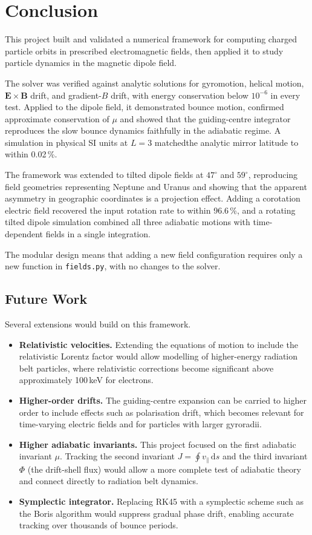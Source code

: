 \chapter{Conclusion}
\label{ch:conclusion}

This project built and validated a numerical framework for computing charged particle orbits in prescribed electromagnetic fields, then applied it to study particle dynamics in the magnetic dipole field.

The solver was verified against analytic solutions for gyromotion, helical motion, $\mathbf{E} \times \mathbf{B}$ drift, and gradient-$B$ drift, with energy conservation below $10^{-6}$ in every test. Applied to the dipole field, it demonstrated bounce motion, confirmed
approximate conservation of $\mu$ and showed that the guiding-centre integrator reproduces the slow bounce dynamics faithfully in the adiabatic regime. A simulation in physical SI units at $L = 3$ matchedthe analytic mirror latitude to within 0.02\,\%.

The framework was extended to tilted dipole fields at $47^\circ$ and $59^\circ$, reproducing field geometries representing Neptune and Uranus and showing that the apparent asymmetry in geographic coordinates is a projection effect. Adding a corotation electric field recovered the input rotation rate to within 96.6\,\%, and a rotating tilted dipole simulation combined all three adiabatic motions with time-dependent fields in a single integration.

The modular design means that adding a new field configuration requires only a new function in \texttt{fields.py}, with no changes to the solver.

\section*{Future Work}
Several extensions would build on this framework.
\begin{itemize}
  \item \textbf{Relativistic velocities.} Extending the equations of
    motion to include the relativistic Lorentz factor would allow
    modelling of higher-energy radiation belt particles, where
    relativistic corrections become significant above approximately
    100\,keV for electrons.
  \item \textbf{Higher-order drifts.} The guiding-centre expansion can
    be carried to higher order to include effects such as polarisation
    drift, which becomes relevant for time-varying electric fields and
    for particles with larger gyroradii.
  \item \textbf{Higher adiabatic invariants.} This project focused on
    the first adiabatic invariant $\mu$. Tracking the second invariant
    $J = \oint v_\parallel \, \mathrm{d}s$ and the third invariant
    $\Phi$ (the drift-shell flux) would allow a more complete test of
    adiabatic theory and connect directly to radiation belt dynamics.
  \item \textbf{Symplectic integrator.} Replacing RK45 with a symplectic
    scheme such as the Boris algorithm would suppress gradual phase
    drift, enabling accurate tracking over thousands of bounce periods.
\end{itemize}